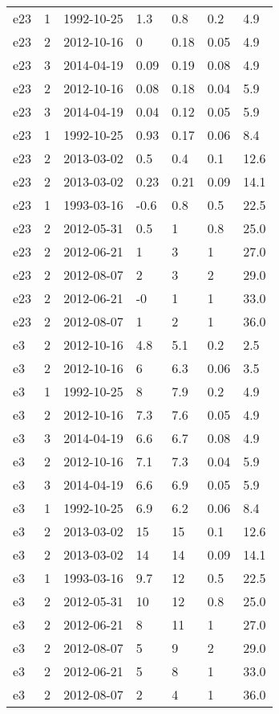 \begin{table*}[htp]
\begin{tabular}{llll}
e23 & 1 & 1992-10-25 & 1.3 & 0.8 & 0.2 & 4.9 \\
e23 & 2 & 2012-10-16 & 0 & 0.18 & 0.05 & 4.9 \\
e23 & 3 & 2014-04-19 & 0.09 & 0.19 & 0.08 & 4.9 \\
e23 & 2 & 2012-10-16 & 0.08 & 0.18 & 0.04 & 5.9 \\
e23 & 3 & 2014-04-19 & 0.04 & 0.12 & 0.05 & 5.9 \\
e23 & 1 & 1992-10-25 & 0.93 & 0.17 & 0.06 & 8.4 \\
e23 & 2 & 2013-03-02 & 0.5 & 0.4 & 0.1 & 12.6 \\
e23 & 2 & 2013-03-02 & 0.23 & 0.21 & 0.09 & 14.1 \\
e23 & 1 & 1993-03-16 & -0.6 & 0.8 & 0.5 & 22.5 \\
e23 & 2 & 2012-05-31 & 0.5 & 1 & 0.8 & 25.0 \\
e23 & 2 & 2012-06-21 & 1 & 3 & 1 & 27.0 \\
e23 & 2 & 2012-08-07 & 2 & 3 & 2 & 29.0 \\
e23 & 2 & 2012-06-21 & -0 & 1 & 1 & 33.0 \\
e23 & 2 & 2012-08-07 & 1 & 2 & 1 & 36.0 \\
e3 & 2 & 2012-10-16 & 4.8 & 5.1 & 0.2 & 2.5 \\
e3 & 2 & 2012-10-16 & 6 & 6.3 & 0.06 & 3.5 \\
e3 & 1 & 1992-10-25 & 8 & 7.9 & 0.2 & 4.9 \\
e3 & 2 & 2012-10-16 & 7.3 & 7.6 & 0.05 & 4.9 \\
e3 & 3 & 2014-04-19 & 6.6 & 6.7 & 0.08 & 4.9 \\
e3 & 2 & 2012-10-16 & 7.1 & 7.3 & 0.04 & 5.9 \\
e3 & 3 & 2014-04-19 & 6.6 & 6.9 & 0.05 & 5.9 \\
e3 & 1 & 1992-10-25 & 6.9 & 6.2 & 0.06 & 8.4 \\
e3 & 2 & 2013-03-02 & 15 & 15 & 0.1 & 12.6 \\
e3 & 2 & 2013-03-02 & 14 & 14 & 0.09 & 14.1 \\
e3 & 1 & 1993-03-16 & 9.7 & 12 & 0.5 & 22.5 \\
e3 & 2 & 2012-05-31 & 10 & 12 & 0.8 & 25.0 \\
e3 & 2 & 2012-06-21 & 8 & 11 & 1 & 27.0 \\
e3 & 2 & 2012-08-07 & 5 & 9 & 2 & 29.0 \\
e3 & 2 & 2012-06-21 & 5 & 8 & 1 & 33.0 \\
e3 & 2 & 2012-08-07 & 2 & 4 & 1 & 36.0 \\

\end{tabular}
\end{table*}

